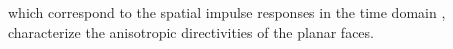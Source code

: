 which correspond to
the spatial impulse responses in
the time domain
\cite{coll:Jensen2002,article:JensenJASA1991}, characterize
the anisotropic directivities of
the planar faces.

